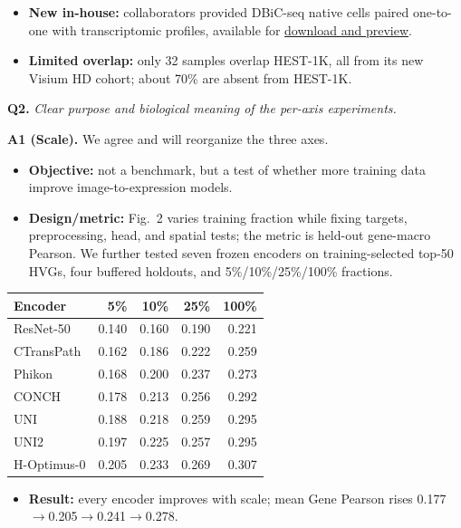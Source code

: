 \documentclass[10pt]{article}
\newcommand{\questionsep}{\par\vspace{1.25em}}
\begin{document}
\begin{itemize}
\item \textbf{New in-house:} collaborators provided DBiC-seq native cells paired
one-to-one with transcriptomic profiles, available for
\href{https://anonymous.4open.science/r/sMMC-22M-DB75/README.md}{download and
preview}.
\item \textbf{Limited overlap:} only 32 samples overlap HEST-1K, all from its
new Visium HD cohort; about 70\% are absent from HEST-1K.
\end{itemize}



\questionsep
\textbf{Q2.}\quad
\textit{Clear purpose and biological meaning of the per-axis experiments.}

\textbf{A1 (Scale).}\enspace
We agree and will reorganize the three axes.
\begin{itemize}
\item \textbf{Objective:} not a benchmark, but a test of whether more training
data improve image-to-expression models.
\item \textbf{Design/metric:} Fig.\ 2 varies training fraction while fixing
targets, preprocessing, head, and spatial tests; the metric is held-out
gene-macro Pearson. We further tested seven frozen encoders on
training-selected top-50 HVGs, four buffered holdouts, and
5\%/10\%/25\%/100\% fractions.
\end{itemize}

\begin{center}
\begingroup
\scriptsize
\setlength{\tabcolsep}{4pt}
\renewcommand{\arraystretch}{1.05}
\begin{tabular*}{\linewidth}{@{\extracolsep{\fill}}lrrrr@{}}
\toprule
Encoder & 5\% & 10\% & 25\% & 100\% \\
\midrule
ResNet-50 & 0.140 & 0.160 & 0.190 & 0.221 \\
CTransPath & 0.162 & 0.186 & 0.222 & 0.259 \\
Phikon & 0.168 & 0.200 & 0.237 & 0.273 \\
CONCH & 0.178 & 0.213 & 0.256 & 0.292 \\
UNI & 0.188 & 0.218 & 0.259 & 0.295 \\
UNI2 & 0.197 & 0.225 & 0.257 & 0.295 \\
H-Optimus-0 & 0.205 & 0.233 & 0.269 & 0.307 \\
\bottomrule
\end{tabular*}
\endgroup
\end{center}

\begin{itemize}
\item \textbf{Result:} every encoder improves with scale; mean Gene Pearson
rises 0.177\(\to\)0.205\(\to\)0.241\(\to\)0.278.
\end{itemize}
\end{document}
